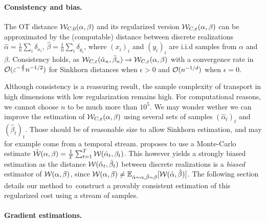 \paragraph{Consistency and bias.} 

The OT distance $\mathcal{W}_{C,0}(\alpha,\beta)$ and its regularized version $\mathcal{W}_{C,\varepsilon}(\alpha,\beta)$ can be approximated by the (computable) distance between discrete realizations $\hat
\alpha = \frac{1}{n} \sum_i \delta_{x_i}$, $\hat \beta = \frac{1}{n} \sum_i
\delta_{y_i}$, where $(x_i)_i$ and $(y_i)_i$ are i.i.d samples from $\alpha$ and
$\beta$.  Consistency holds, as $\mathcal{W}_{C,\varepsilon}(\hat \alpha_n, \hat \beta_n) \to
\mathcal{W}_{C,\varepsilon}(\alpha, \beta)$ with a convergence rate in $\mathcal{O}(\varepsilon^{-\frac{d}{2}}n^{-1/2})$ for Sinkhorn
distances when $\epsilon>0$ and $\mathcal{O}(n^{-1/d})$ when $\epsilon=0$. 

Although consistency is a reassuring result, the sample complexity of transport
in high dimensions with low regularization remains high. For computational
reasons, we cannot choose $n$ to be much more than $10^5$. We may wonder wether
we can improve the estimation of $\mathcal{W}_{C,\varepsilon}(\alpha,\beta)$ using several sets of
samples $(\hat \alpha_t)_t$ and ${(\hat \beta_t)}_t$. Those should be of
reasonable size to allow Sinkhorn estimation, and may for example come from a
temporal stream. \citet{2018-Genevay-aistats} proposes to use a Monte-Carlo
estimate $\hat {\mathcal{W}}(\alpha, \beta) = \frac{1}{T} \sum_{t=1}^T \mathcal{W}(\hat \alpha_t,
\beta_t)$. This however yields a strongly biased estimation as the distance $\mathcal{W}(\hat
\alpha_t, \hat \beta_t)$ between discrete realizations is a \textit{biased}
estimator of $\mathcal{W}(\alpha, \beta)$, since 
$\mathcal{W}(\alpha, \beta) \neq 
    \mathbb{E}_{\hat \alpha \sim \alpha, \hat \beta \sim \beta} [\mathcal{W}(\hat \alpha, \hat \beta)]$. The following section details our method  to construct a provably consistent estimation of this regularized cost using a stream of samples. 

\paragraph{Gradient estimations.}\label{sec:gradient} 

